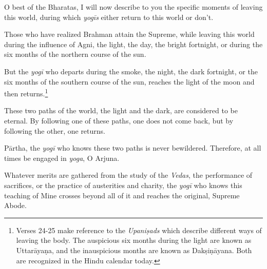 {O best of the Bharatas, I will now describe to you the specific moments of leaving this world, during which \textit{yogīs} either return to this world or don't.}

{Those who have realized Brahman attain the Supreme, while leaving this world during the influence of Agni, the light, the day, the bright fortnight, or during the six months of the northern course of the sun.}

{But the \textit{yogī} who departs during the smoke, the night, the dark fortnight, or the six months of the southern course of the sun, reaches the light of the moon and then returns.\footnote{Verses 24-25 make reference to the \textit{Upaniṣads} which describe different ways of leaving the body. The auspicious six months during the light are known as Uttarāyaṇa, and the inauspicious months are known as Dakṣiṇāyana. Both are recognized in the Hindu calendar today.}}

{These two paths of the world, the light and the dark, are considered to be eternal. By following one of these paths, one does not come back, but by following the other, one returns.}

{Pārtha, the \textit{yogī} who knows these two paths is never bewildered. Therefore, at all times be engaged in \textit{yoga}, O Arjuna.}

{Whatever merits are gathered from the study of the \textit{Vedas}, the performance of sacrifices, or the practice of austerities and charity, the \textit{yogī} who knows this teaching of Mine crosses beyond all of it and reaches the original, Supreme Abode.}

